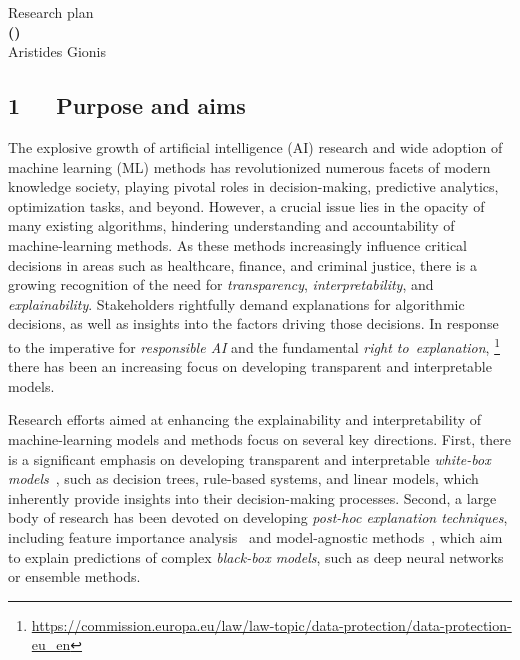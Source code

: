 \documentclass[a4paper,11pt]{article}
\begin{document}
\begin{center} 
{\Large Research plan} \vspace{3mm}\\
{\Large\bf {\proposaltitle} {\sc (}{\acronymtitle}{\sc )}}  \vspace{3mm} \\
{\Large Aristides Gionis} 
\end{center}


\subsection*{1~~~Purpose and aims}


The explosive growth of artificial intelligence (AI) research and wide adoption of machine learning (ML) methods 
has revolutionized numerous facets of modern knowledge society, 
playing pivotal roles in decision-making, predictive analytics, optimization tasks, and beyond. 
However, a crucial issue lies in the opacity of many existing algorithms, 
hindering understanding and accountability of machine-learning methods. 
As these methods increasingly influence critical decisions in areas such as 
healthcare, finance, and criminal justice, 
there is a growing recognition of the need for \emph{transparency}, 
\emph{interpretability}, and \emph{explainability}.
Stakeholders rightfully demand explanations for algorithmic decisions, 
as well as insights into the factors driving those decisions. 
In response to the imperative for \emph{responsible AI} and the fundamental \emph{right to~expla\-na\-tion},%
\footnote{\url{https://commission.europa.eu/law/law-topic/data-protection/data-protection-eu_en}}
there has been an increasing focus on developing transparent and interpretable models.

Research efforts aimed at enhancing the explainability and interpretability 
of machine-learning models and methods focus on several key directions. 
First, there is a significant emphasis on developing transparent and interpretable 
\emph{white-box models}~\cite{loyola2019black}, 
such as decision trees, rule-based systems, and linear models, 
which inherently provide insights into their decision-making processes. 
Second, a large body of research has been devoted on developing \emph{post-hoc explanation techniques}, 
including feature importance analysis~\cite{lundberg2017unified} and 
model-agnostic methods~\cite{ribeiro2016model}, 
which aim to explain predictions of complex \emph{black-box models}, 
such as deep neural networks or ensemble methods.
\end{document}
